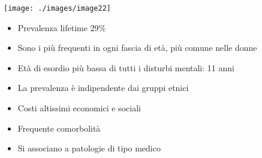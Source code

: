 \texttt{[image: ./images/image22]}
\medskip\\
\begin{itemize}
	\item Prevalenza lifetime 29\%
	\item Sono i più frequenti in ogni fascia di età, più comune nelle donne
	\item Età di esordio più bassa di tutti i disturbi mentali: 11 anni
	\item La prevalenza è indipendente dai gruppi etnici
	\item Costi altissimi economici e sociali
	\item Frequente comorbolità 
	\item Si associano a patologie di tipo medico
\end{itemize}



